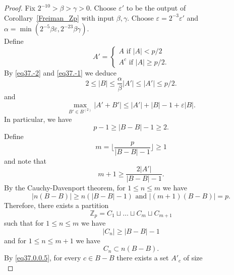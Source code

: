 \documentclass[12pt,reqno]{amsart}
\theoremstyle{definition}
\renewcommand\leq{\leqslant}
\renewcommand\geq{\geqslant}
\begin{document}
\begin{proof}
Fix $2^{-10}>\beta>\gamma>0$. Choose $\varepsilon'$ to be the output of Corollary~\ref{Freiman_Zp} with input $\beta, \gamma$. Choose $\varepsilon=2^{-3}\varepsilon'$ and $\alpha=\min(2^{-5}\beta \varepsilon, 2^{-23}\beta \gamma )$.  \\

\vspace{5pt}
Define
$$A'=
\begin{cases}
A \text{ if } |A| < p/2 \\
A^c \text{ if } |A| \geq p/2.
\end{cases}
$$
By \eqref{eq37.-2} and \eqref{eq37.-1} we deduce
\begin{equation}\label{eq37.0}
    2\leq |B| \leq \frac{\alpha}{\beta} |A'| \leq |A'| \leq p/2.
\end{equation}
and 
\begin{equation}\label{eq37.0.0.5}
    \max_{B' \in B^{(2)}}|A'+B'| \leq |A'|+|B|-1+\varepsilon |B|.
\end{equation}
In particular, we have
\begin{equation*}\label{eq37.0.1}
    p-1\geq |B-B|-1 \geq 2.
\end{equation*}
Define
\begin{equation*}\label{eq37.0.2}
    m=\big\lfloor \frac{p}{|B-B|-1} \big\rfloor \geq 1
\end{equation*}
and note that
\begin{equation}\label{eq37.0.3}
    m+1 \geq \frac{2|A'|}{|B-B|-1}.
\end{equation}
By the Cauchy-Davenport theorem, for $1\leq n \leq m $
we have
\begin{equation}\label{eq37.0.5}
    |n(B-B)| \geq n(|B-B|-1) \text{ and } |(m+1)(B-B)|=p.
\end{equation}
Therefore,  there exists a partition
\begin{equation}\label{eq37.0.6}
    \mathbb{Z}_p=C_1 \sqcup \hdots \sqcup C_m \sqcup C_{m+1}
\end{equation}
such that for $1\leq n \leq m$ we have
\begin{equation}\label{eq37.0.7}
   |C_n| \geq |B-B|-1
\end{equation}
and for $1\leq n \leq m+1$ we have
\begin{equation}\label{eq37.0.9}
    C_n \subset n(B-B).
\end{equation}
By \eqref{eq37.0.0.5}, for every $c \in B-B$ there exists a set $A'_c$  of size
\begin{equation*}\label{eq37.1}

\end{equation*}
\end{proof}
\end{document}
